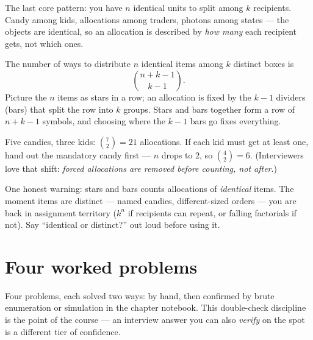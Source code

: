 The last core pattern: you have $n$ identical units to split among $k$ recipients. Candy among kids, allocations among traders, photons among states --- the objects are identical, so an allocation is described by \emph{how many} each recipient gets, not which ones.

\begin{notebox}
The number of ways to distribute $n$ identical items among $k$ distinct boxes is
\[
\binom{n + k - 1}{k - 1}.
\]
Picture the $n$ items as stars in a row; an allocation is fixed by the $k-1$ dividers (bars) that split the row into $k$ groups. Stars and bars together form a row of $n + k - 1$ symbols, and choosing where the $k-1$ bars go fixes everything.
\end{notebox}

Five candies, three kids: $\binom{7}{2} = 21$ allocations. If each kid must get at least one, hand out the mandatory candy first --- $n$ drops to $2$, so $\binom{4}{2} = 6$. (Interviewers love that shift: \emph{forced allocations are removed before counting, not after}.)

One honest warning: stars and bars counts allocations of \emph{identical} items. The moment items are distinct --- named candies, different-sized orders --- you are back in assignment territory ($k^n$ if recipients can repeat, or falling factorials if not). Say ``identical or distinct?'' out loud before using it.

\section{Four worked problems}

Four problems, each solved two ways: by hand, then confirmed by brute enumeration or simulation in the chapter notebook. This double-check discipline is the point of the course --- an interview answer you can also \emph{verify} on the spot is a different tier of confidence.

